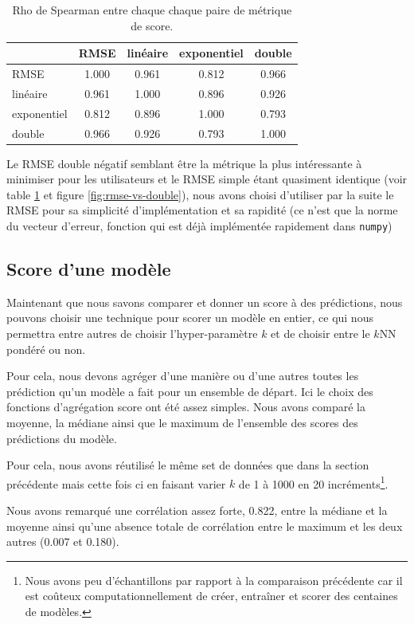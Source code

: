 \documentclass[letterpaper]{article}
\begin{document}
\begin{table}[h]
\centering
\begin{tabular}{|l|c|c|c|c|}
  \hline
  & RMSE & linéaire & exponentiel & double \\
  \hline
RMSE & 1.000 & 0.961 & 0.812 & 0.966 \\
linéaire & 0.961 & 1.000 & 0.896 & 0.926 \\
exponentiel & 0.812 & 0.896 & 1.000 & 0.793 \\
double & 0.966 & 0.926 & 0.793 & 1.000 \\
  \hline
\end{tabular}
  \caption{\label{tab:rho} Rho de Spearman entre chaque chaque paire de métrique de score.}
\end{table}

Le RMSE double négatif semblant être la métrique la plus intéressante à minimiser pour les utilisateurs et le RMSE simple étant quasiment identique (voir table \ref{tab:rho} et figure \ref{fig:rmse-vs-double}), nous avons choisi d'utiliser par la suite le RMSE pour sa simplicité d'implémentation et sa rapidité (ce n'est que la norme du vecteur d'erreur, fonction qui est déjà implémentée rapidement dans \texttt{numpy})

\FloatBarrier
\subsection{Score d'une modèle}

Maintenant que nous savons comparer et donner un score à des prédictions, nous pouvons choisir une technique pour scorer un modèle en entier, ce qui nous permettra entre autres de choisir l'hyper-paramètre $k$ et de choisir entre le $k$NN pondéré ou non.

Pour cela, nous devons agréger d'une manière ou d'une autres toutes les prédiction qu'un modèle a fait pour un ensemble de départ. Ici le choix des fonctions d’agrégation score ont été assez simples. Nous avons comparé la moyenne, la médiane ainsi que le maximum de l'ensemble des scores des prédictions du modèle.

Pour cela, nous avons réutilisé le même set de données que dans la section précédente mais cette fois ci en faisant varier $k$ de 1 à 1000 en 20 incréments\footnote{Nous avons peu d’échantillons par rapport à la comparaison précédente car il est coûteux computationnellement de créer, entraîner et scorer des centaines de modèles.}.

Nous avons remarqué une corrélation assez forte, 0.822, entre la médiane et la moyenne ainsi qu'une absence totale de corrélation entre le maximum et les deux autres (0.007 et 0.180).
\end{document}
